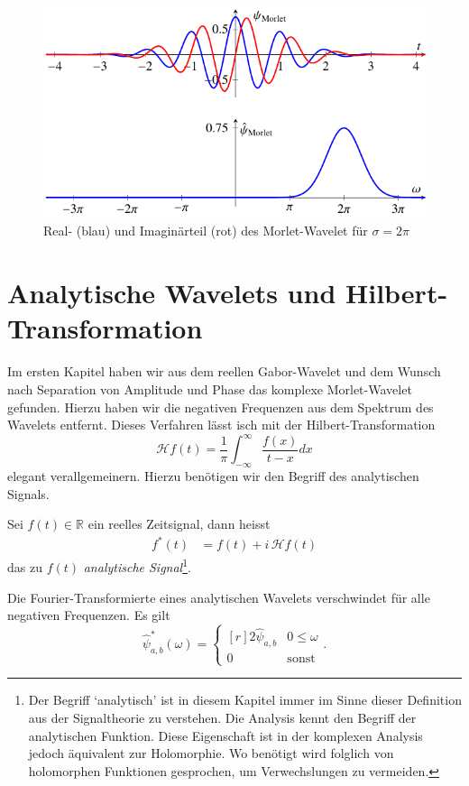 \begin{refsection}
\begin{figure}
	\centering
	\includegraphics{papers/complex/images/morlet.pdf}
	\caption{Real- (blau) und Imaginärteil (rot) des Morlet-Wavelet für $\sigma = 2\pi$ \label{complex:morlet}}
\end{figure}


\section{Analytische Wavelets und Hilbert-Transformation}
Im ersten Kapitel haben wir aus dem reellen Gabor-Wavelet und dem Wunsch nach Separation von Amplitude und Phase das komplexe Morlet-Wavelet gefunden.
Hierzu haben wir die negativen Frequenzen aus dem Spektrum des Wavelets entfernt.
Dieses Verfahren lässt isch mit der Hilbert-Transformation
\[
	\mathcal{H}f(t) =
	\frac{1}{\pi}\int_{-\infty}^{\infty}\frac{f(x)}{t-x} dx
\]
elegant verallgemeinern.
Hierzu benötigen wir den Begriff des analytischen Signals.
\begin{definition}
	Sei $f(t) \in \mathbb{R}$ ein reelles Zeitsignal, dann heisst
	\begin{align*}
		f^\ast(t) 
		&= f(t) + i\,\mathcal{H}f(t)
	\end{align*}
	das zu $f(t)$ \emph{analytische Signal}\footnote{Der Begriff `analytisch' ist in diesem Kapitel immer im Sinne dieser Definition aus der Signaltheorie zu verstehen.
	Die Analysis kennt den Begriff der analytischen Funktion. 
	Diese Eigenschaft ist in der komplexen Analysis jedoch äquivalent zur Holomorphie.
	Wo benötigt wird folglich von holomorphen Funktionen gesprochen, um Verwechslungen zu vermeiden.
	}.
\end{definition}


\begin{satz}
	Die Fourier-Transformierte eines analytischen Wavelets verschwindet für alle negativen Frequenzen.
	Es gilt
	\[
		\hat{\psi}^\ast_{a,b}(\omega) = \left\lbrace\begin{matrix*}[r]	
			2\hat{\psi}_{a,b} & 0 \le \omega \\ 0 & \text{sonst}\end{matrix*} \right..
	\]
\end{satz}


\end{refsection}
